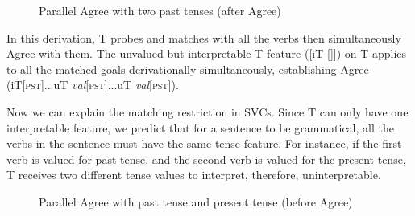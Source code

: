 \documentclass[output=paper,colorlinks,citecolor=brown]{langscibook}
\begin{document}
\begin{figure}[p]
\caption{\label{ex35b}Parallel Agree with two past tenses (after Agree)}
\end{figure}

In this derivation, T probes and matches with all the verbs then simultaneously Agree with them. The unvalued but interpretable T feature ([iT []]) on T applies to all the matched goals derivationally simultaneously, establishing Agree (iT[\textsc{pst}]...uT \emph{val}[\textsc{pst}]...uT \emph{val}[\textsc{pst}]).

Now we can explain the matching restriction in SVCs. Since T can only have one interpretable feature, we predict that for a sentence to be grammatical, all the verbs in the sentence must have the same tense feature. For instance, if the first verb is valued for past tense, and the second verb is valued for the present tense, T receives two different tense values to interpret, therefore, uninterpretable. 


\begin{figure}[p]
\caption{\label{ex36a}Parallel Agree with past tense and present tense  (before Agree)}
\end{figure}
\end{document}
